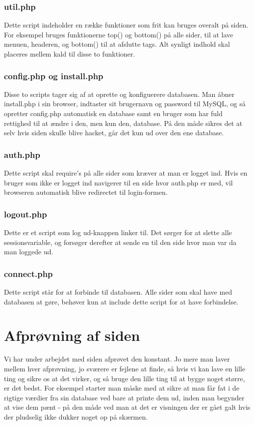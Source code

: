 \documentclass{article}
\begin{document}
\subsubsection{util.php}
Dette script indeholder en række funktioner som frit kan bruges overalt på siden. For eksempel bruges funktionerne top() og bottom() på alle sider, til at lave menuen, headeren, og bottom() til at afslutte tags. Alt synligt indhold skal placeres mellem kald til disse to funktioner.

\subsubsection{config.php og install.php}
Disse to scripts tager sig af at oprette og konfiguerere databasen. Man åbner install.php i sin browser, indtaster sit brugernavn og password til MySQL, og så opretter config.php automatisk en database samt en bruger som har fuld rettighed til at ændre i den, men kun den, database. På den måde sikres det at selv hvis siden skulle blive hacket, går det kun ud over den ene database.

\subsubsection{auth.php}
Dette script skal require's på alle sider som kræver at man er logget ind. Hvis en bruger som ikke er logget ind navigerer til en side hvor auth.php er med, vil browseren automatisk blive redirectet til login-formen.

\subsubsection{logout.php}
Dette er et script som log ud-knappen linker til. Det sørger for at slette alle sessionsvariable, og forsøger derefter at sende en til den side hvor man var da man loggede ud.

\subsubsection{connect.php}
Dette script står for at forbinde til databasen. Alle sider som skal have med databasen at gøre, behøver kun at include dette script for at have forbindelse.

\section{Afprøvning af siden}
Vi har under arbejdet med siden afprøvet den konstant. Jo mere man laver mellem hver afprøvning, jo sværere er fejlene at finde, så hvis vi kan lave en lille ting og sikre os at det virker, og så bruge den lille ting til at bygge noget større, er det bedst. For eksempel starter man måske med at sikre at man får fat i de rigtige værdier fra sin database ved bare at printe dem ud, inden man begynder at vise dem pænt - på den måde ved man at det er visningen der er gået galt hvis der pludselig ikke dukker noget op på skærmen.
\end{document}
